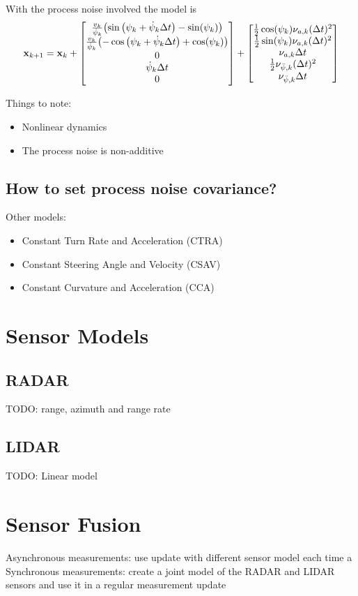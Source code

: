 \documentclass[a4paper,11pt]{article}
\begin{document}
	With the process noise involved the model is
	\begin{equation}
		\stVar_{\tind+1} = 
		\stVar_\tind +
		\bmqty{
			\frac{v_\tind}{\dot{\psi}_\tind}\pqty{\sin\pqty\big{\psi_\tind + \dot{\psi}_\tind \Delta t} - \sin(\psi_\tind)} \\
			\frac{v_\tind}{\dot{\psi}_\tind}\pqty{-\cos\pqty\big{\psi_\tind + \dot{\psi}_\tind \Delta t} + \cos(\psi_\tind)} \\
			0 \\
			\dot{\psi}_\tind \Delta t \\
			0
		} + 
		\bmqty{
			\frac{1}{2}\cos(\psi_\tind) \nu_{a, \tind} (\Delta t)^2 \\
			\frac{1}{2}\sin(\psi_\tind) \nu_{a, \tind} (\Delta t)^2 \\
			\nu_{a, \tind} \Delta t \\
			\frac{1}{2} \nu_{\ddot{\psi}, \tind} (\Delta t)^2 \\
			\nu_{\ddot{\psi}, \tind} \Delta t
		}
	\end{equation}

	Things to note:
	\begin{itemize}
		\item Nonlinear dynamics
		\item The process noise is non-additive
	\end{itemize}

	
	\subsection{How to set process noise covariance?}
	Other models:
	\begin{itemize}
		\item Constant Turn Rate and Acceleration (CTRA)
		\item Constant Steering Angle and Velocity (CSAV)
		\item Constant Curvature and Acceleration (CCA)
	\end{itemize}
	


	
	\section{Sensor Models}
	\subsection{RADAR}
	TODO: range, azimuth and range rate
	
	
	\subsection{LIDAR}
	TODO: Linear model
	
	

	\section{Sensor Fusion}
	Asynchronous measurements: use update with different sensor model each time a  \\
	Synchronous measurements: create a joint model of the RADAR and LIDAR sensors and use it in a regular measurement update
	
\end{document}
